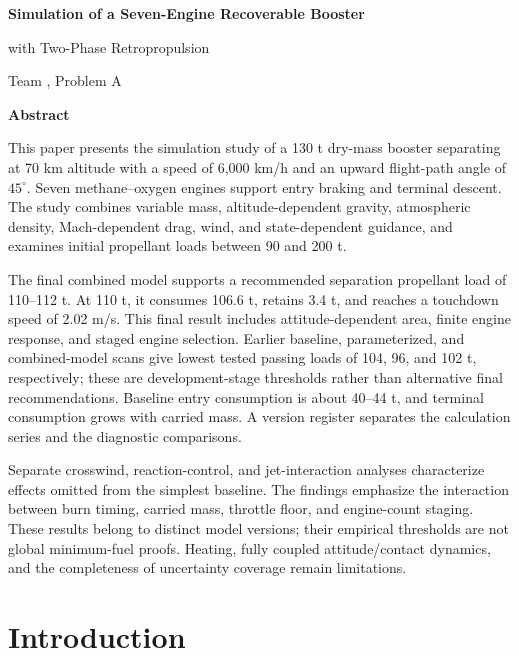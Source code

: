 \documentclass[11pt,a4paper]{article}
\begin{document}
\hypersetup{pageanchor=false}
\thispagestyle{fancy}
\begin{center}
\vspace*{6mm}
{\LARGE\bfseries Simulation of a Seven-Engine Recoverable Booster\par with Two-Phase Retropropulsion\par}
\vspace{5mm}
{\large Team \TeamNumber, Problem A\par}
\vspace{6mm}
{\large\bfseries Abstract\par}
\end{center}
\noindent
This paper presents the simulation study of a 130 t dry-mass booster separating at 70 km altitude with a speed of 6,000 km/h and an upward flight-path angle of $45^\circ$. Seven methane--oxygen engines support entry braking and terminal descent. The study combines variable mass, altitude-dependent gravity, atmospheric density, Mach-dependent drag, wind, and state-dependent guidance, and examines initial propellant loads between 90 and 200 t.

The final combined model supports a recommended separation propellant load of 110--112 t. At 110 t, it consumes 106.6 t, retains 3.4 t, and reaches a touchdown speed of 2.02 m/s. This final result includes attitude-dependent area, finite engine response, and staged engine selection. Earlier baseline, parameterized, and combined-model scans give lowest tested passing loads of 104, 96, and 102 t, respectively; these are development-stage thresholds rather than alternative final recommendations. Baseline entry consumption is about 40--44 t, and terminal consumption grows with carried mass. A version register separates the calculation series and the diagnostic comparisons.

Separate crosswind, reaction-control, and jet-interaction analyses characterize effects omitted from the simplest baseline. The findings emphasize the interaction between burn timing, carried mass, throttle floor, and engine-count staging. These results belong to distinct model versions; their empirical thresholds are not global minimum-fuel proofs. Heating, fully coupled attitude/contact dynamics, and the completeness of uncertainty coverage remain limitations.
\clearpage
\hypersetup{pageanchor=true}
{\small\tableofcontents}
\clearpage
{}

\section{Introduction}
\end{document}
